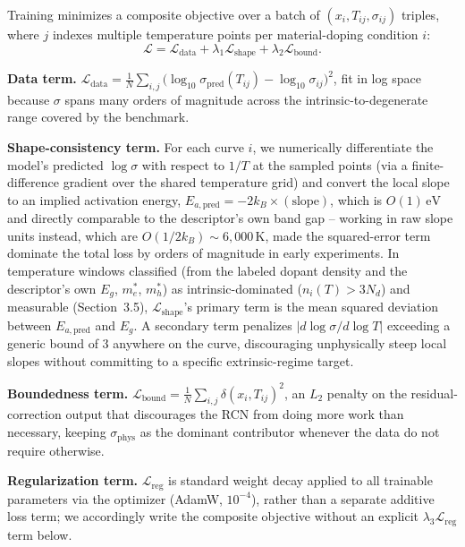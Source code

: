 \documentclass[11pt]{article}
\begin{document}
Training minimizes a composite objective over a batch of $(x_i, T_{ij}, \sigma_{ij})$ triples, where $j$ indexes multiple temperature points per material-doping condition $i$:
\begin{equation}
\mathcal{L} = \mathcal{L}_{\text{data}} + \lambda_1 \mathcal{L}_{\text{shape}} + \lambda_2 \mathcal{L}_{\text{bound}}.
\end{equation}

\textbf{Data term.} $\mathcal{L}_{\text{data}} = \frac{1}{N}\sum_{i,j} \big(\log_{10}\sigma_{\text{pred}}(T_{ij}) - \log_{10}\sigma_{ij}\big)^2$, fit in log space because $\sigma$ spans many orders of magnitude across the intrinsic-to-degenerate range covered by the benchmark.

\textbf{Shape-consistency term.} For each curve $i$, we numerically differentiate the model's predicted $\log\sigma$ with respect to $1/T$ at the sampled points (via a finite-difference gradient over the shared temperature grid) and convert the local slope to an implied activation energy, $E_{a,\text{pred}} = -2k_B \times (\text{slope})$, which is $O(1)\,\text{eV}$ and directly comparable to the descriptor's own band gap -- working in raw slope units instead, which are $O(1/2k_B)\sim 6{,}000\,\text{K}$, made the squared-error term dominate the total loss by orders of magnitude in early experiments. In temperature windows classified (from the labeled dopant density and the descriptor's own $E_g$, $m_e^{*}$, $m_h^{*}$) as intrinsic-dominated ($n_i(T) > 3 N_d$) and measurable (Section~3.5), $\mathcal{L}_{\text{shape}}$'s primary term is the mean squared deviation between $E_{a,\text{pred}}$ and $E_g$. A secondary term penalizes $|d\log\sigma/d\log T|$ exceeding a generic bound of 3 anywhere on the curve, discouraging unphysically steep local slopes without committing to a specific extrinsic-regime target.

\textbf{Boundedness term.} $\mathcal{L}_{\text{bound}} = \frac{1}{N}\sum_{i,j} \delta(x_i, T_{ij})^2$, an $L_2$ penalty on the residual-correction output that discourages the RCN from doing more work than necessary, keeping $\sigma_{\text{phys}}$ as the dominant contributor whenever the data do not require otherwise.

\textbf{Regularization term.} $\mathcal{L}_{\text{reg}}$ is standard weight decay applied to all trainable parameters via the optimizer (AdamW, $10^{-4}$), rather than a separate additive loss term; we accordingly write the composite objective without an explicit $\lambda_3\mathcal{L}_{\text{reg}}$ term below.
\end{document}
